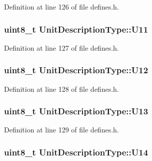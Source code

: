 Definition at line 126 of file defines.\+h.

\subsubsection[{\texorpdfstring{U11}{U11}}]{\setlength{\rightskip}{0pt plus 5cm}uint8\+\_\+t Unit\+Description\+Type\+::\+U11}\hypertarget{structUnitDescriptionType_a73d351d321ae6bbcd5ad8c14c96ad0a8}{}\label{structUnitDescriptionType_a73d351d321ae6bbcd5ad8c14c96ad0a8}


Definition at line 127 of file defines.\+h.

\subsubsection[{\texorpdfstring{U12}{U12}}]{\setlength{\rightskip}{0pt plus 5cm}uint8\+\_\+t Unit\+Description\+Type\+::\+U12}\hypertarget{structUnitDescriptionType_a31d9700085a4dcf3e0d2298e8c877f5f}{}\label{structUnitDescriptionType_a31d9700085a4dcf3e0d2298e8c877f5f}


Definition at line 128 of file defines.\+h.

\subsubsection[{\texorpdfstring{U13}{U13}}]{\setlength{\rightskip}{0pt plus 5cm}uint8\+\_\+t Unit\+Description\+Type\+::\+U13}\hypertarget{structUnitDescriptionType_a686a531e040eca159c41bba7705d8963}{}\label{structUnitDescriptionType_a686a531e040eca159c41bba7705d8963}


Definition at line 129 of file defines.\+h.

\subsubsection[{\texorpdfstring{U14}{U14}}]{\setlength{\rightskip}{0pt plus 5cm}uint8\+\_\+t Unit\+Description\+Type\+::\+U14}\hypertarget{structUnitDescriptionType_a4a6129e1bed33bf743895f5864208cc0}{}\label{structUnitDescriptionType_a4a6129e1bed33bf743895f5864208cc0}


